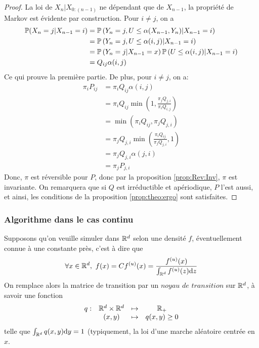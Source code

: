 \begin{proof}
La loi de $X_n \vert X_{0:(n-1)}$ ne dépendant que de $X_{n-1}$, la propriété de Markov est évidente par construction. Pour $i\neq j$, on a
\begin{align*}
\mathbb{P}(X_{n} = j \vert X_{n -1} = i) &= \mathbb{P}\left(Y_{n} = j , U\leq \alpha(X_{n-1}, Y_{n})\vert X_{n -1} = i \right)\\
&=  \mathbb{P}\left(Y_{n} = j , U\leq \alpha(i, j)\vert X_{n -1} = i \right)\\
&=\mathbb{P}\left(Y_{n} = j \vert X_{n-1} = x\right)\mathbb{P}\left( U\leq \alpha(i, j)\vert X_{n -1} = i \right)\\
&= Q_{ij}\alpha(i,j)
\end{align*}
Ce qui prouve la première partie. De plus, pour $i\neq j$, on a:
\begin{align*}
\pi_iP_{ij} &=  \pi_i Q_{ij}\alpha(i, j)\\
&= \pi_i Q_{ij} \min\left(1, \frac{\pi_{j}Q_{j, i}}{\pi_{i}Q_{i,j}}\right)\\
&= \min\left(\pi_i Q_{ij}, \pi_{j}Q_{j, i}\right)\\
&= \pi_{j}Q_{j, i}\min\left(\frac{\pi_i Q_{ij}}{ \pi_{j}Q_{j, i}}, 1 \right)\\
&= \pi_{j}Q_{j, i}\alpha(j,i)\\
&=\pi_{j}P_{j,i}
\end{align*}
Donc, $\pi$ est réversible pour $P$, donc par la proposition \ref{prop:Rev:Inv}, $\pi$ est invariante.
On remarquera que si $Q$ est irréductible et apériodique, $P$ l'est aussi, et ainsi, les conditions de la proposition \ref{prop:theo:ergo} sont satisfaites.
\end{proof}

\subsubsection{Algorithme dans le cas continu}

Supposons qu'on veuille simuler dans $\mathbb{R}^d$ selon une densité $f$, éventuellement connue à une constante près, c'est à dire que 
$$\forall x \in \mathbb{R}^d,~f(x) = C f^{(u)}(x) = \frac{f^{(u)}(x)}{\int_{\mathbb{R}^d}f^{(u)}(z)\text{d} z}$$
On remplace alors la matrice de transition par un $\textit{noyau de transition}$ sur $\mathbb{R}^d$, à savoir une fonction
\begin{equation*}
\begin{array}{lccc}
q:& \mathbb{R}^d\times \mathbb{R}^d &\mapsto& \mathbb{R}_+\\
& (x, y) & \mapsto & q(x, y)\geq 0
\end{array}
\end{equation*}
telle que $\int_{\mathbb{R}^d}q(x, y)\text{d} y = 1$ (typiquement, la loi d'une marche aléatoire centrée en $x$.


